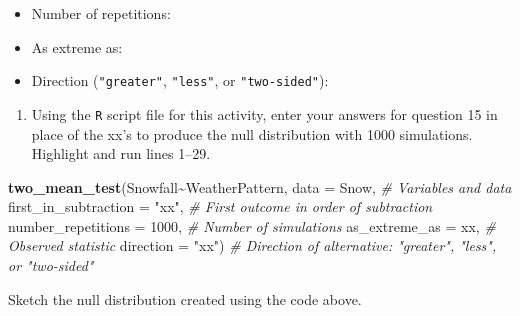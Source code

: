 \documentclass[
]{report}
\newenvironment{Shaded}{\begin{snugshade}}{\end{snugshade}}
\newcommand{\CommentTok}[1]{\textcolor[rgb]{0.56,0.35,0.01}{\textit{#1}}}
\newcommand{\DataTypeTok}[1]{\textcolor[rgb]{0.13,0.29,0.53}{#1}}
\newcommand{\DecValTok}[1]{\textcolor[rgb]{0.00,0.00,0.81}{#1}}
\newcommand{\KeywordTok}[1]{\textcolor[rgb]{0.13,0.29,0.53}{\textbf{#1}}}
\newcommand{\NormalTok}[1]{#1}
\newcommand{\OperatorTok}[1]{\textcolor[rgb]{0.81,0.36,0.00}{\textbf{#1}}}
\newcommand{\StringTok}[1]{\textcolor[rgb]{0.31,0.60,0.02}{#1}}
\providecommand{\tightlist}{%
  \setlength{\itemsep}{0pt}\setlength{\parskip}{0pt}}
\begin{document}
\vspace{.2in}

\begin{itemize}
\tightlist
\item
  Number of repetitions:
\end{itemize}

\vspace{.2in}

\begin{itemize}
\tightlist
\item
  As extreme as:
\end{itemize}

\vspace{.2in}

\begin{itemize}
\tightlist
\item
  Direction (\texttt{"greater"}, \texttt{"less"}, or \texttt{"two-sided"}):
\end{itemize}

\vspace{.2in}

\begin{enumerate}
\def\labelenumi{\arabic{enumi}.}
\setcounter{enumi}{15}
\tightlist
\item
  Using the \texttt{R} script file for this activity, enter your answers for question 15 in place of the xx's to produce the null distribution with 1000 simulations. Highlight and run lines 1--29.
\end{enumerate}

\begin{Shaded}
\begin{Highlighting}[]
\KeywordTok{two\_mean\_test}\NormalTok{(Snowfall}\OperatorTok{\textasciitilde{}}\NormalTok{WeatherPattern, }\DataTypeTok{data =}\NormalTok{ Snow,  }\CommentTok{\# Variables and data}
                    \DataTypeTok{first\_in\_subtraction =} \StringTok{"xx"}\NormalTok{, }\CommentTok{\# First outcome in order of subtraction}
                    \DataTypeTok{number\_repetitions =} \DecValTok{1000}\NormalTok{,  }\CommentTok{\# Number of simulations}
                    \DataTypeTok{as\_extreme\_as =}\NormalTok{ xx,  }\CommentTok{\# Observed statistic}
                    \DataTypeTok{direction =} \StringTok{"xx"}\NormalTok{)  }\CommentTok{\# Direction of alternative: "greater", "less", or "two{-}sided"}
\end{Highlighting}
\end{Shaded}

Sketch the null distribution created using the code above.
\vspace{1.5in}
\end{document}
